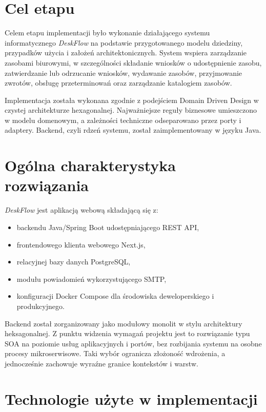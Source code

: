 \label{chapter:rozdzialczwarty}

\section{Cel etapu}

Celem etapu implementacji było wykonanie działającego systemu informatycznego \textit{DeskFlow} na podstawie przygotowanego modelu dziedziny, przypadków użycia i założeń architektonicznych. System wspiera zarządzanie zasobami biurowymi, w szczególności składanie wniosków o udostępnienie zasobu, zatwierdzanie lub odrzucanie wniosków, wydawanie zasobów, przyjmowanie zwrotów, obsługę przeterminowań oraz zarządzanie katalogiem zasobów.

Implementacja została wykonana zgodnie z podejściem Domain Driven Design w czystej architekturze hexagonalnej. Najważniejsze reguły biznesowe umieszczono w modelu domenowym, a zależności techniczne odseparowano przez porty i adaptery. Backend, czyli rdzeń systemu, został zaimplementowany w języku Java. 

\section{Ogólna charakterystyka rozwiązania}

\textit{DeskFlow} jest aplikacją webową składającą się z:
\begin{itemize}
    \item backendu Java/Spring Boot udostępniającego REST API,
    \item frontendowego klienta webowego Next.js,
    \item relacyjnej bazy danych PostgreSQL,
    \item modułu powiadomień wykorzystującego SMTP,
    \item konfiguracji Docker Compose dla środowiska deweloperskiego i produkcyjnego.
\end{itemize}

Backend został zorganizowany jako modułowy monolit w stylu architektury heksagonalnej. Z punktu widzenia wymagań projektu jest to rozwiązanie typu SOA na poziomie usług aplikacyjnych i portów, bez rozbijania systemu na osobne procesy mikroserwisowe. Taki wybór ogranicza złożoność wdrożenia, a jednocześnie zachowuje wyraźne granice kontekstów i warstw.

\section{Technologie użyte w implementacji}

